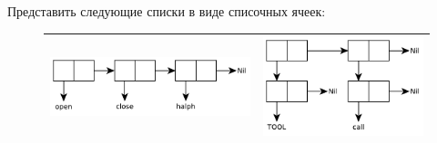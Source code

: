 \documentclass[a4paper]{report}
\begin{document}
\begin{task}
	Представить следующие списки в виде списочных ячеек:
	\begin{AutoMultiColEnumerate}
		\item {}
		\item {}
		\item {}
		\item {}
		\item {}
		\item {}
	\end{AutoMultiColEnumerate}
\end{task}

\begin{figure}[!h]
	\begin{tabular}{|l|l|}
		\hline
		\includegraphics[scale=0.475]{inc/img/task0101.pdf} & \includegraphics[scale=0.475]{inc/img/task0104.pdf} \\\hline

\end{tabular}
\end{figure}
\end{document}
